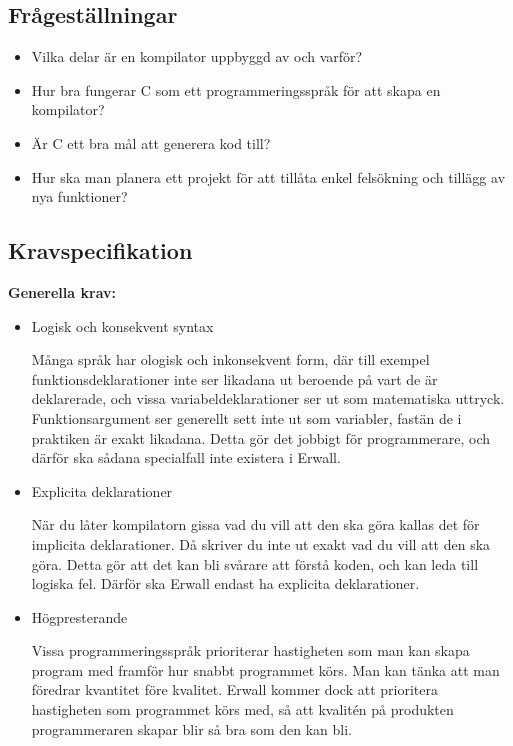 \documentclass{theme}
\begin{document}
\subsection{Frågeställningar}

\begin{itemize}
	\item Vilka delar är en kompilator uppbyggd av och varför?

	\item Hur bra fungerar C som ett programmeringsspråk för att skapa en 
		kompilator?

	\item Är C ett bra mål att generera kod till?

	\item Hur ska man planera ett projekt för att tillåta enkel felsökning och 
		tillägg av nya funktioner?

\end{itemize}

\subsection{Kravspecifikation}

\textbf{Generella krav:}

\begin{itemize}
	\item Logisk och konsekvent syntax

		Många språk har ologisk och inkonsekvent form, där till exempel
		funktionsdeklarationer inte ser likadana ut beroende på vart de
		är deklarerade, och vissa variabeldeklarationer ser ut som matematiska
		uttryck. Funktionsargument ser generellt sett inte ut som variabler, 
		fastän de i praktiken är exakt likadana. Detta gör det jobbigt för 
		programmerare, och därför ska sådana specialfall inte existera i Erwall.

	\item Explicita deklarationer

		När du låter kompilatorn gissa vad du vill att den ska göra kallas det 
		för implicita deklarationer. Då skriver du inte ut exakt vad du vill att
		den ska göra. Detta gör att det kan bli svårare att förstå koden, och 
		kan leda till logiska fel. Därför ska Erwall endast ha explicita 
		deklarationer.

	\item Högpresterande

		Vissa programmeringsspråk prioriterar hastigheten som man kan skapa 
		program med framför hur snabbt programmet körs. Man kan tänka att man
		föredrar kvantitet före kvalitet. Erwall kommer dock att prioritera 
		hastigheten som programmet körs med, så att kvalitén på produkten 
		programmeraren skapar blir så bra som den kan bli.\\

\end{itemize}
\end{document}

